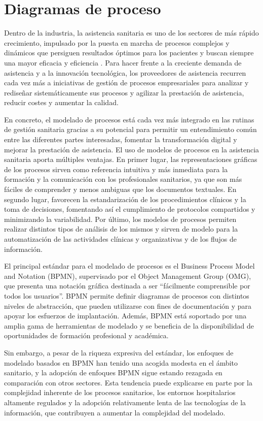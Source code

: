\section{Diagramas de proceso}

Dentro de la industria, la asistencia sanitaria es uno de los sectores de más rápido crecimiento, impulsado por la puesta en marcha de procesos complejos y dinámicos que persiguen resultados óptimos para los pacientes y buscan siempre una mayor eficacia y eficiencia \cite{pufahl_bpmn_2022}.
Para hacer frente a la creciente demanda de asistencia y a la innovación tecnológica, los proveedores de asistencia recurren cada vez más a iniciativas de gestión de procesos empresariales para analizar y rediseñar sistemáticamente sus procesos y agilizar la prestación de asistencia, reducir costes y aumentar la calidad.

En concreto, el modelado de procesos está cada vez más integrado en las rutinas de gestión sanitaria gracias a su potencial para permitir un entendimiento común entre las diferentes partes interesadas, fomentar la transformación digital y mejorar la prestación de asistencia.
El uso de modelos de procesos en la asistencia sanitaria aporta múltiples ventajas.
En primer lugar, las representaciones gráficas de los procesos sirven como referencia intuitiva y más inmediata para la formación y la comunicación con los profesionales sanitarios, ya que son más fáciles de comprender y menos ambiguas que los documentos textuales.
En segundo lugar, favorecen la estandarización de los procedimientos clínicos y la toma de decisiones, fomentando así el cumplimiento de protocolos compartidos y minimizando la variabilidad.
Por último, los modelos de procesos permiten realizar distintos tipos de análisis de los mismos y sirven de modelo para la automatización de las actividades clínicas y organizativas y de los flujos de información.

El principal estándar para el modelado de procesos es el Business Process Model and Notation (BPMN), supervisado por el Object Management Group (OMG), que presenta una notación gráfica destinada a ser ``fácilmente comprensible por todos los usuarios''.
BPMN permite definir diagramas de procesos con distintos niveles de abstracción, que pueden utilizarse con fines de documentación y para apoyar los esfuerzos de implantación.
Además, BPMN está soportado por una amplia gama de herramientas de modelado y se beneficia de la disponibilidad de oportunidades de formación profesional y académica.

Sin embargo, a pesar de la riqueza expresiva del estándar, los enfoques de modelado basados en BPMN han tenido una acogida modesta en el ámbito sanitario, y la adopción de enfoques BPMN sigue estando rezagada en comparación con otros sectores.
Esta tendencia puede explicarse en parte por la complejidad inherente de los procesos sanitarios, los entornos hospitalarios altamente regulados y la adopción relativamente lenta de las tecnologías de la información, que contribuyen a aumentar la complejidad del modelado.

